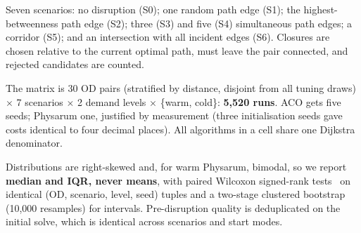 Seven scenarios: no disruption (S0); one random path edge (S1); the
highest-betweenness path edge (S2); three (S3) and five (S4) simultaneous
path edges; a corridor (S5); and an intersection with all incident edges
(S6). Closures are chosen relative to the current optimal path, must leave
the pair connected, and rejected candidates are counted.

The matrix is 30 OD pairs (stratified by distance, disjoint from all tuning
draws) $\times$ 7 scenarios $\times$ 2 demand levels $\times$ \{warm,
cold\}: \textbf{5{,}520 runs}. ACO gets five seeds; Physarum one, justified
by measurement (three initialisation seeds gave costs identical to four
decimal places). All algorithms in a cell share one Dijkstra denominator.

Distributions are right-skewed and, for warm Physarum, bimodal, so we report
\textbf{median and IQR, never means}, with paired Wilcoxon signed-rank
tests~\cite{wilcoxon1945individual} on identical (OD, scenario, level, seed)
tuples and a two-stage clustered bootstrap (10{,}000 resamples) for
intervals. Pre-disruption quality is deduplicated on the initial solve,
which is identical across scenarios and start modes.
